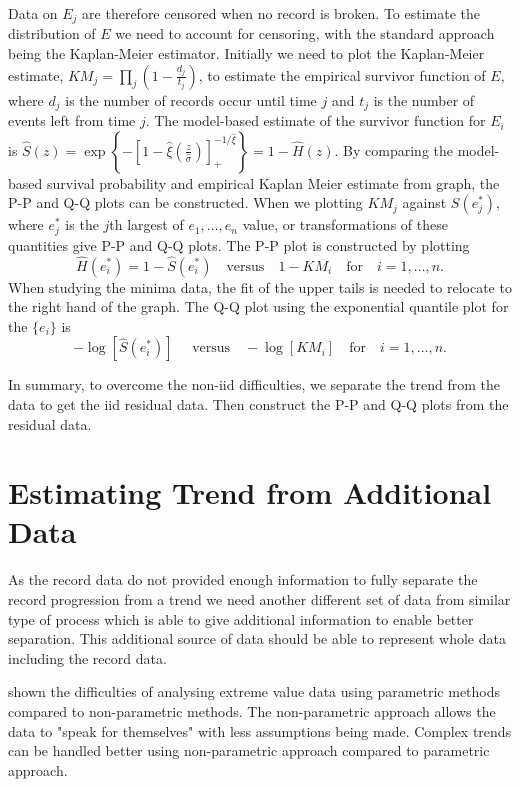 \documentclass[10pt]{article}
\begin{document}
Data on $E_j$ are therefore censored when no record is broken. To
estimate the distribution of $E$ we need to account for censoring,
with the standard approach being the Kaplan-Meier estimator. Initially
we need to plot the Kaplan-Meier estimate,  $KM_j=\prod_{j} (1 -
\frac{d_j}{t_j}) $,  to estimate the empirical survivor function of
$E$, where $d_j $ is the number of records occur until time $j$ and
$t_j$ is the number of events left from time $j$. The model-based
estimate of the survivor function for $E_i$ is $ 
\hat{S}(z) = \exp  \left\{ -\left [ 1-\hat{\xi} \left(
      \frac{z}{\hat{\sigma}} \right) \right ]^{-1/\hat{\xi}}_+ 
\right \}  = 1 - \hat{H}(z).
$
By comparing the model-based survival probability and empirical Kaplan Meier
estimate from graph, the P-P and Q-Q plots can be constructed. 
When we plotting $KM_j$ against $S(e^{*}_j)$, where $e^{*}_j$ is the
$j$th largest of $e_1,\ldots,e_n$ value, or transformations of these
quantities give P-P and Q-Q plots. 
The P-P plot is constructed by plotting 
\[\hat{H}(e^{*}_i)=1-\hat{S}(e^{*}_i) \quad \mbox{versus} \quad 1- KM_i \quad \mbox{for} \quad i=1,\ldots,n. \]
When studying the minima data, the fit of the
upper tails is needed to relocate to the right hand of the graph. The
Q-Q plot using the exponential quantile plot for the $\{e_i\}$ is
\[ -\log \left[\hat{S}(e^{*}_i)\right] \quad \mbox{ versus}\quad -\log\left[ KM_i\right] \quad
\mbox{for} \quad i=1,\ldots,n .\] 

In summary, to overcome the non-iid
difficulties, we separate the trend from the data to get the iid residual
data. Then construct the P-P and Q-Q plots from the residual data.


\section{Estimating Trend from Additional Data }\label{Chap5Sec4}%



As the record data do not provided enough information to fully
separate the record progression from a trend we need another different
set of data from similar type of process which is able to give
additional information to enable better separation. This additional
source of data should be able to represent whole data including the
record data.

\citet{Adam2007} shown the difficulties of analysing extreme
value data using parametric methods compared to non-parametric
methods. The non-parametric approach allows the data to "speak
for themselves"  with less assumptions being made. Complex trends 
can be handled better using non-parametric approach compared to
parametric approach. 
\end{document}
